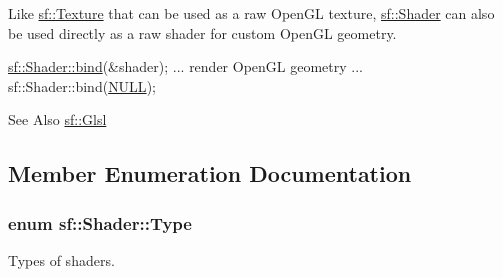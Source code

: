 Like \hyperlink{classsf_1_1_texture}{sf\-::\-Texture} that can be used as a raw Open\-G\-L texture, \hyperlink{classsf_1_1_shader}{sf\-::\-Shader} can also be used directly as a raw shader for custom Open\-G\-L geometry. 
\begin{DoxyCode}
\hyperlink{classsf_1_1_shader_a09778f78afcbeb854d608c8dacd8ea30}{sf::Shader::bind}(&shader);
... render OpenGL geometry ...
sf::Shader::bind(\hyperlink{internal_8h_a070d2ce7b6bb7e5c05602aa8c308d0c4}{NULL});
\end{DoxyCode}


\begin{DoxySeeAlso}{See Also}
\hyperlink{namespacesf_1_1_glsl}{sf\-::\-Glsl} 
\end{DoxySeeAlso}


\subsection{Member Enumeration Documentation}
\hypertarget{classsf_1_1_shader_afaa1aa65e5de37b74d047da9def9f9b3}{
\subsubsection[{Type}]{\setlength{\rightskip}{0pt plus 5cm}enum {\bf sf\-::\-Shader\-::\-Type}}}\label{classsf_1_1_shader_afaa1aa65e5de37b74d047da9def9f9b3}


Types of shaders. 

